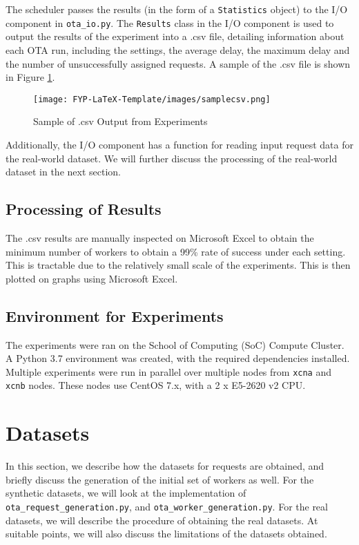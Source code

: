 \documentclass[urop]{socreport}
\begin{document}
The scheduler passes the results (in the form of a \verb|Statistics| object) to the I/O component in \verb|ota_io.py|. The \verb|Results| class in the I/O component is used to output the results of the experiment into a .csv file, detailing information about each OTA run, including the settings, the average delay, the maximum delay and the number of unsuccessfully assigned requests. A sample of the .csv file is shown in Figure \ref{fig:samplecsv}.

\begin{figure}
    \centering
    \texttt{[image: FYP-LaTeX-Template/images/samplecsv.png]}
    \caption{Sample of .csv Output from Experiments}
    \label{fig:samplecsv}
\end{figure}

Additionally, the I/O component has a function for reading input request data for the real-world dataset. We will further discuss the processing of the real-world dataset in the next section.

\subsection{Processing of Results}
The .csv results are manually inspected on Microsoft Excel to obtain the minimum number of workers to obtain a 99\% rate of success under each setting. This is tractable due to the relatively small scale of the experiments. This is then plotted on graphs using Microsoft Excel.

\subsection{Environment for Experiments}
The experiments were ran on the School of Computing (SoC) Compute Cluster. A Python 3.7 environment was created, with the required dependencies installed. Multiple experiments were run in parallel over multiple nodes from \verb|xcna| and \verb|xcnb| nodes. These nodes use CentOS 7.x, with a 2 x E5-2620 v2 CPU.


\section{Datasets}
In this section, we describe how the datasets for requests are obtained, and briefly discuss the generation of the initial set of workers as well. For the synthetic datasets, we will look at the implementation of \verb|ota_request_generation.py|, and \verb|ota_worker_generation.py|. For the real datasets, we will describe the procedure of obtaining the real datasets. At suitable points, we will also discuss the limitations of the datasets obtained.
\end{document}
